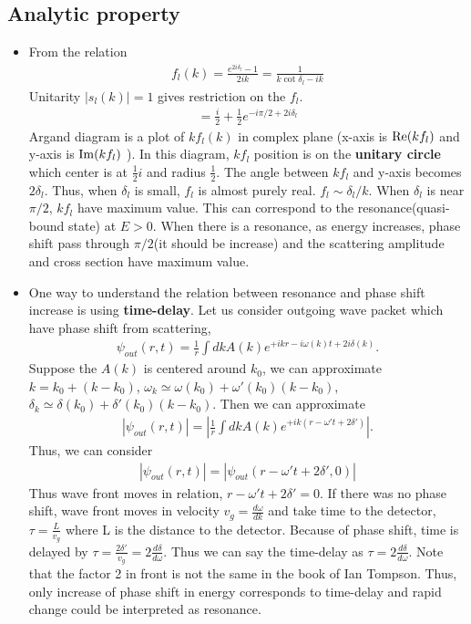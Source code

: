 \documentclass[10pt]{book}
\newcommand{\bea}{\begin{eqnarray}}
\newcommand{\eea}{\end{eqnarray}}
\begin{document}
\subsection{Analytic property}
\begin{itemize}
\item 
From the relation 
\bea 
f_l(k)=\frac{e^{2i\delta_l}-1}{2ik}=\frac{1}{k\cot\delta_l-ik}
\eea 
Unitarity $|s_l(k)|=1$ gives restriction on the $f_l$.
\bea
[k f_l]=\frac{i}{2}+\frac{1}{2}e^{-i\pi/2+2i\delta_l}
\eea 
Argand diagram is a plot of $k f_l(k)$ in complex plane
(x-axis is ${\rm Re}(k f_l)$ and y-axis is ${\rm Im}(k f_l)$ ).
In this diagram, $k f_l$ position is on the {\bf unitary circle} which center is
at $\frac{1}{2} i$ and radius $\frac{1}{2}$. The angle between
$k f_l$ and y-axis becomes $2\delta_l$. 
Thus, when $\delta_l$ is small, $f_l$ is almost purely real. $f_l\sim \delta_l/k$.
When $\delta_l$ is near $\pi/2$, $kf_l$ have maximum value. 
This can correspond to the resonance(quasi-bound state) at $E>0$. 
When there is a resonance, as energy increases, 
phase shift pass through $\pi/2$(it should be increase) and 
the scattering amplitude and cross section have maximum value. 

\item One way to understand the relation between resonance and phase shift increase is using 
      {\bf time-delay}.
      Let us consider outgoing wave packet which have phase shift from scattering,
      \bea 
      \psi_{out}(r,t)=\frac{1}{r}\int dk A(k) e^{+i k r -i\omega(k)t+2i\delta(k)}.
      \eea 
      Suppose the $A(k)$ is centered around $k_0$, we can approximate
      $k=k_0+(k-k_0)$,
      $\omega_k\simeq \omega(k_0)+\omega'(k_0)(k-k_0)$,
      $\delta_k\simeq \delta(k_0)+\delta'(k_0)(k-k_0)$.
      Then we can approximate
      \bea 
      |\psi_{out}(r,t)|=|\frac{1}{r}\int dk A(k) e^{+i k(r-\omega' t+2\delta') }|.
      \eea 
     Thus, we can consider
     \bea  
     |\psi_{out}(r,t)|=|\psi_{out}(r-\omega't+2\delta',0)|
     \eea  
     Thus wave front moves in relation, $r-\omega't+2\delta'=0$. If there was no phase shift,
     wave front moves in velocity $v_g=\frac{d\omega}{dk}$ and take time to the detector,
     $\tau=\frac{L}{v_g}$ where L is the distance to the detector. 
     Because of phase shift, time is delayed by $\tau=\frac{2\delta'}{v_g}=2\frac{d\delta}{d \omega} $.
     Thus we can say the time-delay as $\tau=2\frac{d\delta}{d \omega} $.
     Note that the factor 2 in front is not the same in the book of Ian Tompson. 
     Thus, only increase of phase shift in energy corresponds to time-delay
     and rapid change could be interpreted as resonance. 
     

\end{itemize}
\end{document}
